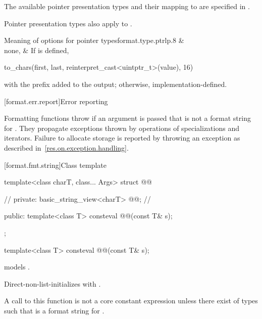 \pnum
The available pointer presentation types and their mapping to
 are specified in .
\begin{note}
Pointer presentation types also apply to .
\end{note}

\begin{floattable}{Meaning of  options for pointer types}{format.type.ptr}{lp{.8\hsize}}
\topline
{} &  \\ \rowsep
none,  &
If  is defined,
\begin{codeblock}
to_chars(first, last, reinterpret_cast<uintptr_t>(value), 16)
\end{codeblock}
with the prefix  added to the output;
otherwise, implementation-defined.
\\
\end{floattable}

[format.err.report]{Error reporting}

\pnum
Formatting functions throw  if
an argument  is passed that
is not a format string for .
They propagate exceptions thrown by operations of
 specializations and iterators.
Failure to allocate storage is reported by
throwing an exception as described in~\ref{res.on.exception.handling}.

[format.fmt.string]{Class template }

\begin{codeblock}
template<class charT, class... Args>
struct @@ {            // \expos
private:
  basic_string_view<charT> @@;         // \expos

public:
  template<class T> consteval @@(const T& s);
};
\end{codeblock}

\begin{itemdecl}
template<class T> consteval @@(const T& s);
\end{itemdecl}

\begin{itemdescr}
\pnum
\constraints
{} models .

\pnum
\effects
Direct-non-list-initializes  with .

\pnum
\remarks
A call to this function is not a core constant expression
unless there exist  of types 
such that  is a format string for .
\end{itemdescr}

